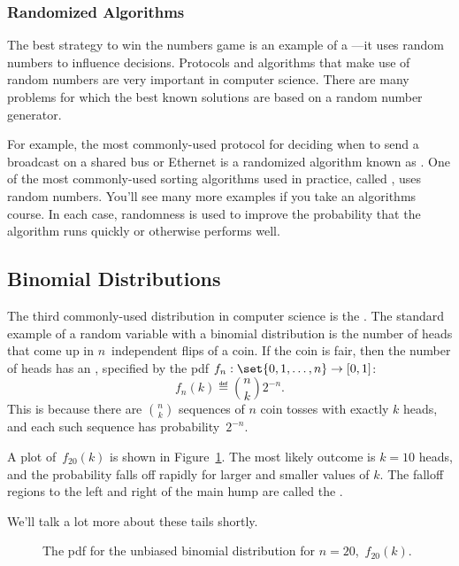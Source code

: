 \subsubsection{Randomized Algorithms}

The best strategy to win the numbers game is an example of a
 ---it uses random numbers to influence
decisions.  Protocols and algorithms that make use of random numbers
are very important in computer science.  There are many problems for
which the best known solutions are based on a random number generator.

For example, the most commonly-used protocol for deciding when to send
a broadcast on a shared bus or Ethernet is a randomized algorithm
known as .  One of the most commonly-used
sorting algorithms used in practice, called , uses
random numbers.  You'll see many more examples if you take an
algorithms course.  In each case, randomness is used to improve the
probability that the algorithm runs quickly or otherwise performs
well.

\subsection{Binomial Distributions}\label{binomial_distribution_section}

The third commonly-used distribution in computer science is the
.  The standard example of a random
variable with a binomial distribution is the number of heads that come
up in $n$~independent flips of a coin.  If the coin is fair, then the
number of heads has an ,
specified by the pdf $f_n: \set{0, 1, \dots, n} \to [0, 1]$:
\[
f_n(k) \eqdef \binom{n}{k}2^{-n}.
\]
This is because there are $\binom{n}{k}$ sequences of $n$ coin tosses
with exactly $k$ heads, and each such sequence has probability~$2^{-n}$.

A plot of~$f_{20}(k)$ is shown in Figure~\ref{fig:16F5}.  The most
likely outcome is $k = 10$ heads, and the probability falls off
rapidly for larger and smaller values of $k$.  The falloff regions to
the left and right of the main hump are called the .

\begin{editingnotes}
We'll talk a lot more about these tails shortly.
\end{editingnotes}

\begin{figure}


\caption{The pdf for the unbiased binomial distribution for $n =
  20$,~$f_{20}(k)$.}

\label{fig:16F5}

\end{figure}

